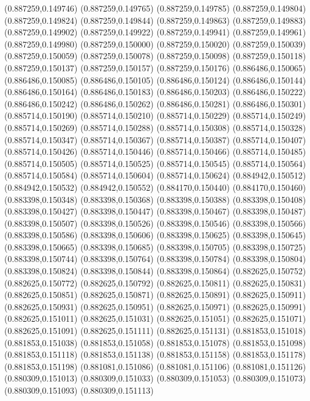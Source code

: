 (0.887259,0.149746)
(0.887259,0.149765)
(0.887259,0.149785)
(0.887259,0.149804)
(0.887259,0.149824)
(0.887259,0.149844)
(0.887259,0.149863)
(0.887259,0.149883)
(0.887259,0.149902)
(0.887259,0.149922)
(0.887259,0.149941)
(0.887259,0.149961)
(0.887259,0.149980)
(0.887259,0.150000)
(0.887259,0.150020)
(0.887259,0.150039)
(0.887259,0.150059)
(0.887259,0.150078)
(0.887259,0.150098)
(0.887259,0.150118)
(0.887259,0.150137)
(0.887259,0.150157)
(0.887259,0.150176)
(0.886486,0.150065)
(0.886486,0.150085)
(0.886486,0.150105)
(0.886486,0.150124)
(0.886486,0.150144)
(0.886486,0.150164)
(0.886486,0.150183)
(0.886486,0.150203)
(0.886486,0.150222)
(0.886486,0.150242)
(0.886486,0.150262)
(0.886486,0.150281)
(0.886486,0.150301)
(0.885714,0.150190)
(0.885714,0.150210)
(0.885714,0.150229)
(0.885714,0.150249)
(0.885714,0.150269)
(0.885714,0.150288)
(0.885714,0.150308)
(0.885714,0.150328)
(0.885714,0.150347)
(0.885714,0.150367)
(0.885714,0.150387)
(0.885714,0.150407)
(0.885714,0.150426)
(0.885714,0.150446)
(0.885714,0.150466)
(0.885714,0.150485)
(0.885714,0.150505)
(0.885714,0.150525)
(0.885714,0.150545)
(0.885714,0.150564)
(0.885714,0.150584)
(0.885714,0.150604)
(0.885714,0.150624)
(0.884942,0.150512)
(0.884942,0.150532)
(0.884942,0.150552)
(0.884170,0.150440)
(0.884170,0.150460)
(0.883398,0.150348)
(0.883398,0.150368)
(0.883398,0.150388)
(0.883398,0.150408)
(0.883398,0.150427)
(0.883398,0.150447)
(0.883398,0.150467)
(0.883398,0.150487)
(0.883398,0.150507)
(0.883398,0.150526)
(0.883398,0.150546)
(0.883398,0.150566)
(0.883398,0.150586)
(0.883398,0.150606)
(0.883398,0.150625)
(0.883398,0.150645)
(0.883398,0.150665)
(0.883398,0.150685)
(0.883398,0.150705)
(0.883398,0.150725)
(0.883398,0.150744)
(0.883398,0.150764)
(0.883398,0.150784)
(0.883398,0.150804)
(0.883398,0.150824)
(0.883398,0.150844)
(0.883398,0.150864)
(0.882625,0.150752)
(0.882625,0.150772)
(0.882625,0.150792)
(0.882625,0.150811)
(0.882625,0.150831)
(0.882625,0.150851)
(0.882625,0.150871)
(0.882625,0.150891)
(0.882625,0.150911)
(0.882625,0.150931)
(0.882625,0.150951)
(0.882625,0.150971)
(0.882625,0.150991)
(0.882625,0.151011)
(0.882625,0.151031)
(0.882625,0.151051)
(0.882625,0.151071)
(0.882625,0.151091)
(0.882625,0.151111)
(0.882625,0.151131)
(0.881853,0.151018)
(0.881853,0.151038)
(0.881853,0.151058)
(0.881853,0.151078)
(0.881853,0.151098)
(0.881853,0.151118)
(0.881853,0.151138)
(0.881853,0.151158)
(0.881853,0.151178)
(0.881853,0.151198)
(0.881081,0.151086)
(0.881081,0.151106)
(0.881081,0.151126)
(0.880309,0.151013)
(0.880309,0.151033)
(0.880309,0.151053)
(0.880309,0.151073)
(0.880309,0.151093)
(0.880309,0.151113)
